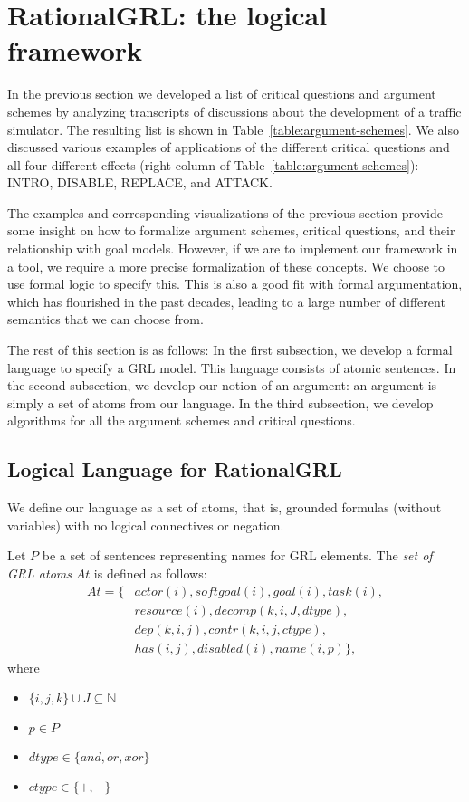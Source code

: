 \section{RationalGRL: the logical framework}
\label{sect:formalframework}

In the previous section we developed a list of critical questions and argument schemes by analyzing transcripts of discussions about the development of a traffic simulator. The resulting list is shown in Table~\ref{table:argument-schemes}. We also discussed various examples of applications of the different critical questions and all four different effects (right column of Table~\ref{table:argument-schemes}): \textsf{INTRO}, \textsf{DISABLE}, \textsf{REPLACE}, and \textsf{ATTACK}.

The examples and corresponding visualizations of the previous section provide some insight on how to formalize argument schemes, critical questions, and their relationship with goal models. However, if we are to implement our framework in a tool, we require a more precise formalization of these concepts.  We choose to use formal logic to specify this. This is also a good fit with formal argumentation, which has flourished in the past decades, leading to a large number of different semantics that we can choose from.

The rest of this section is as follows: In the first subsection, we develop a formal language to specify a GRL model. This language consists of atomic sentences. In the second subsection, we develop our notion of an argument: an argument is simply a set of atoms from our language. In the third subsection, we develop algorithms for all the argument schemes and critical questions.

\subsection{Logical Language for RationalGRL}
\label{sect:goalmodeling:logicallanguage}

We define our language as a set of atoms, that is, grounded formulas (without variables) with no logical connectives or negation.

\begin{definition}
Let $P$ be a set of sentences representing names for GRL elements. The \emph{set of GRL atoms} $At$ is defined as follows: 
\begin{align*}
At = \{&actor(i), softgoal(i), goal(i), task(i),\\
&resource(i), decomp(k,i,J,dtype),\\
&dep(k,i,j),contr(k,i,j,ctype),\\
&has(i,j),disabled(i),name(i,p)\},
\end{align*}
where
\begin{itemize}
\item $\{i,j,k\}\cup J \subseteq\mathbb{N}$
\item $p\in P$
\item $dtype\in\{and,or,xor\}$
\item $ctype\in\{+,-\}$
\end{itemize}
\end{definition}

